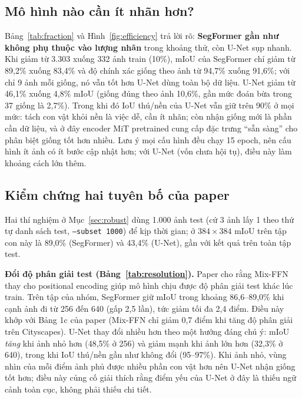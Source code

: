 \documentclass[12pt]{article}
\newcommand{\code}[1]{\texttt{#1}}
\newcommand{\st}[1]{\textbf{#1}}
\begin{document}
\subsection{Mô hình nào cần ít nhãn hơn?}
Bảng~\ref{tab:fraction} và Hình~\ref{fig:efficiency} trả lời rõ: \st{SegFormer gần như không phụ thuộc vào lượng nhãn} trong
khoảng thử, còn U-Net sụp nhanh. Khi giảm từ 3.303 xuống 332 ảnh train (10\%), mIoU của SegFormer chỉ giảm từ 89,2\% xuống
83,4\% và độ chính xác giống theo ảnh từ 94,7\% xuống 91,6\%; với chỉ 9 ảnh mỗi giống, nó vẫn tốt hơn U-Net dùng toàn bộ dữ liệu.
U-Net giảm từ 46,1\% xuống 4,8\% mIoU (giống đúng theo ảnh 10,6\%, gần mức đoán bừa trong 37 giống là 2,7\%). Trong khi đó IoU
thú/nền của U-Net vẫn giữ trên 90\% ở mọi mức: tách con vật khỏi nền là việc dễ, cần ít nhãn; còn nhận giống mới là phần cần
dữ liệu, và ở đây encoder MiT pretrained cung cấp đặc trưng ``sẵn sàng'' cho phân biệt giống tốt hơn nhiều. Lưu ý mọi cấu hình
đều chạy 15 epoch, nên cấu hình ít ảnh có ít bước cập nhật hơn; với U-Net (vốn chưa hội tụ), điều này làm khoảng cách lớn thêm.

\subsection{Kiểm chứng hai tuyên bố của paper}
Hai thí nghiệm ở Mục~\ref{sec:robust} dùng 1.000 ảnh test (cứ 3 ảnh lấy 1 theo thứ tự danh sách test, \code{--subset 1000}) để kịp thời gian;
ở $384\times384$ mIoU trên tập con này là 89,0\% (SegFormer) và 43,4\% (U-Net), gần với kết quả trên toàn tập test.

\textbf{Đổi độ phân giải test (Bảng~\ref{tab:resolution}).} Paper cho rằng Mix-FFN thay cho positional encoding giúp mô hình
chịu được độ phân giải test khác lúc train. Trên tập của nhóm, SegFormer giữ mIoU trong khoảng 86,6--89,0\% khi cạnh ảnh đi từ
256 đến 640 (gấp 2,5 lần), tức giảm tối đa 2,4 điểm. Điều này khớp với Bảng 1c của paper (Mix-FFN chỉ giảm 0,7 điểm khi tăng
độ phân giải trên Cityscapes). U-Net thay đổi nhiều hơn theo một hướng đáng chú ý: mIoU \emph{tăng} khi ảnh nhỏ hơn (48,5\% ở 256)
và giảm mạnh khi ảnh lớn hơn (32,3\% ở 640), trong khi IoU thú/nền gần như không đổi (95--97\%). Khi ảnh nhỏ, vùng nhìn của
mỗi điểm ảnh phủ được nhiều phần con vật hơn nên U-Net nhận giống tốt hơn; điều này củng cố giải thích rằng điểm yếu của
U-Net ở đây là thiếu ngữ cảnh toàn cục, không phải thiếu chi tiết.
\end{document}
